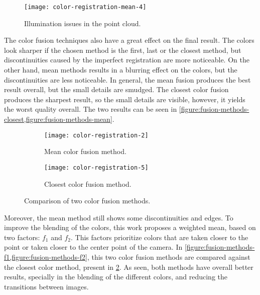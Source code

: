 \begin{figure}[h]
    
    \centering
    \texttt{[image: color-registration-mean-4]}

    \caption{Illumination issues in the point cloud.}
    \label{figure:illumination-issues-pointcloud}

\end{figure}

The color fusion techniques also have a great effect on the final result. The colors look sharper if the chosen method is the first, last or the closest method, but discontinuities caused by the imperfect registration are more noticeable. On the other hand, mean methods results in a blurring effect on the colors, but the discontinuities are less noticeable. In general, the mean fusion produces the best result overall, but the small details are smudged. The closest color fusion produces the sharpest result, so the small details are visible, however, it yields the worst quality overall. The two results can be seen in \cref{figure:fusion-methods-closest,figure:fusion-methods-mean}.

\begin{figure}[h]
    
    \centering
    \begin{subfigure}[t]{0.7\textwidth}
        \centering
        \texttt{[image: color-registration-2]}

        \caption{Mean color fusion method.}
        \label{figure:fusion-methods-mean}
    \end{subfigure}

    \begin{subfigure}[t]{0.7\textwidth}
        \centering
        \texttt{[image: color-registration-5]}

        \caption{Closest color fusion method.}
        \label{figure:fusion-methods-closest}
    \end{subfigure}%

    \caption{Comparison of two color fusion methods.}
    \label{figure:fusion-methods-1}

\end{figure}

Moreover, the mean method still shows some discontinuities and edges. To improve the blending of the colors, this work proposes a weighted mean, based on two factors: $f_1$ and $f_2$. This factors prioritize colors that are taken closer to the point or taken closer to the center point of the camera. In \cref{figure:fusion-methods-f1,figure:fusion-methods-f2}, this two color fusion methods are compared against the closest color method, present in \cref{figure:fusion-methods-mean}. As seen, both methods have overall better results, specially in the blending of the different colors, and reducing the transitions between images.

